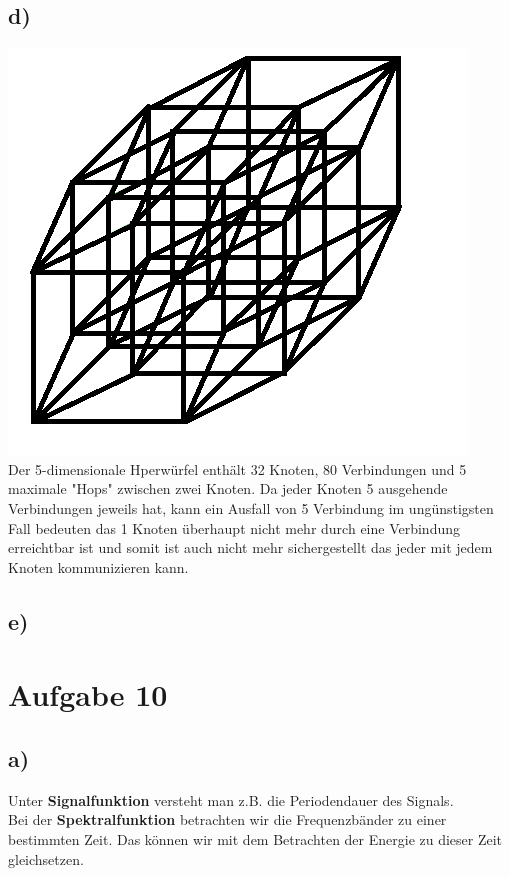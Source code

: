 \documentclass[a4paper,12pt]{scrartcl}
\begin{document}
\subsection{d)}
\includegraphics{./images/Blatt-4-Aufgabe17d}\\
Der 5-dimensionale Hperwürfel enthält 32 Knoten, 80 Verbindungen und 5 maximale "Hops" zwischen zwei Knoten. Da jeder Knoten 5 ausgehende Verbindungen jeweils hat, kann ein Ausfall von 5 Verbindung im ungünstigsten Fall bedeuten das 1 Knoten überhaupt nicht mehr durch eine Verbindung erreichtbar ist und somit ist auch nicht mehr sichergestellt das jeder mit jedem Knoten kommunizieren kann.
\subsection{e)}




\section{Aufgabe 10}
\subsection{a)}
Unter \textbf{Signalfunktion} versteht man z.B. die
Periodendauer des Signals.\\
Bei der \textbf{Spektralfunktion} betrachten wir
die Frequenzbänder zu einer bestimmten Zeit. Das
können wir mit dem Betrachten der Energie zu dieser
Zeit gleichsetzen.
\end{document}
